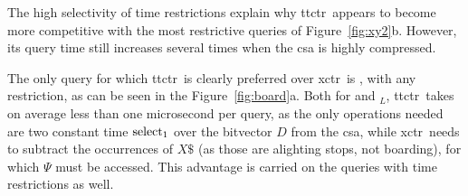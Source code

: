     The high selectivity of time restrictions explain why \gls{ttctr}~appears to become more competitive with the most restrictive queries of Figure~\ref{fig:xy2}b. However, its query time still increases several times when the \gls{csa} is highly compressed.
    
    The only query for which \gls{ttctr}~is clearly preferred over \gls{xctr}~is \boardX, with any restriction, as can be seen in the Figure~\ref{fig:board}a. Both for \boardX and \boardX$_{L}$, \gls{ttctr}~takes on average less than one microsecond per query, as the only operations needed are two constant time $\operatorname{select}_1$ over the bitvector $D$ from the \gls{csa}, while \gls{xctr}~needs to subtract the occurrences of $X\$$ (as those are alighting stops, not boarding), for which $\Psi$ must be accessed. This advantage is carried on the queries with time restrictions as well.
    
